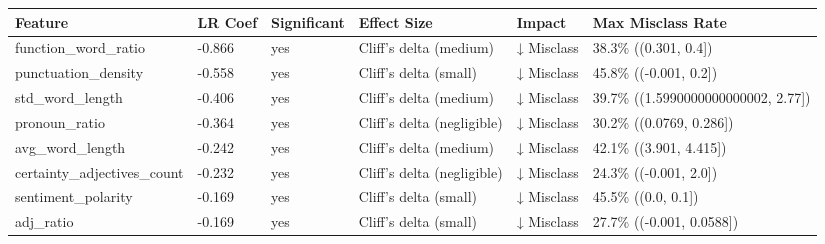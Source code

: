 \begin{tabular}{llllll}
\toprule
Feature & LR Coef & Significant & Effect Size & Impact & Max Misclass Rate \\
\midrule
function\_word\_ratio & -0.866 & yes & Cliff's delta (medium) & ↓ Misclass & 38.3\% ((0.301, 0.4]) \\
punctuation\_density & -0.558 & yes & Cliff's delta (small) & ↓ Misclass & 45.8\% ((-0.001, 0.2]) \\
std\_word\_length & -0.406 & yes & Cliff's delta (medium) & ↓ Misclass & 39.7\% ((1.5990000000000002, 2.77]) \\
pronoun\_ratio & -0.364 & yes & Cliff's delta (negligible) & ↓ Misclass & 30.2\% ((0.0769, 0.286]) \\
avg\_word\_length & -0.242 & yes & Cliff's delta (medium) & ↓ Misclass & 42.1\% ((3.901, 4.415]) \\
certainty\_adjectives\_count & -0.232 & yes & Cliff's delta (negligible) & ↓ Misclass & 24.3\% ((-0.001, 2.0]) \\
sentiment\_polarity & -0.169 & yes & Cliff's delta (small) & ↓ Misclass & 45.5\% ((0.0, 0.1]) \\
adj\_ratio & -0.169 & yes & Cliff's delta (small) & ↓ Misclass & 27.7\% ((-0.001, 0.0588]) \\
\bottomrule
\end{tabular}
